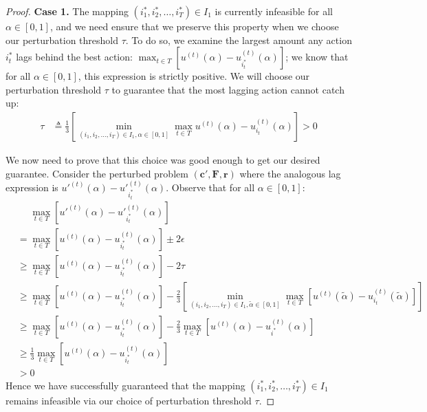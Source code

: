 \documentclass{article}
\newcommand{\CostVector}{\bm{c}}
\newcommand{\ForecastTensor}{\bm{F}}
\newcommand{\RewardVector}{\bm{r}}
\newcommand{\TransferCoefficient}{\alpha}
\newcommand{\actionmapping}{(i_1, i_2, \ldots, i_T)}
\newcommand{\optactionmapping}{(i^*_1, i^*_2, \ldots, i^*_T)}
\begin{document}
\begin{proof}
  \textbf{Case 1.} The mapping $\optactionmapping \in I_1$ is currently infeasible for all $\TransferCoefficient \in [0, 1]$, and we need ensure that we preserve this property when we choose our perturbation threshold $\tau$. To do so, we examine the largest amount any action $i^*_t$ lags behind the best action: $\max_{t \in T} \left[ u^{(t)}(\TransferCoefficient) - u^{(t)}_{i^*_t}(\TransferCoefficient) \right]$; we know that for all $\TransferCoefficient \in [0, 1]$, this expression is strictly positive. We will choose our perturbation threshold $\tau$ to guarantee that the most lagging action cannot catch up:
  \begin{align*}
    \tau &\triangleq \frac13 \left[ \min_{\actionmapping \in I_1, \TransferCoefficient \in [0, 1]} \max_{t \in T} u^{(t)}(\TransferCoefficient) - u^{(t)}_{i_t}(\TransferCoefficient) \right] > 0
  \end{align*}
  
  We now need to prove that this choice was good enough to get our desired guarantee. Consider the perturbed problem $(\CostVector', \ForecastTensor, \RewardVector)$ where the analogous lag expression is $u'^{(t)}(\TransferCoefficient) - u'^{(t)}_{i^*_t}(\TransferCoefficient)$. Observe that for all $\TransferCoefficient \in [0, 1]$:
  \begin{align*}
    &\phantom{=} \max_{t \in T} \left[ u'^{(t)}(\TransferCoefficient) - u'^{(t)}_{i^*_t}(\TransferCoefficient) \right] \\
    &= \max_{t \in T} \left[ u^{(t)}(\TransferCoefficient) - u^{(t)}_{i^*_t}(\TransferCoefficient) \right] \pm 2 \epsilon \\
    &\ge \max_{t \in T} \left[ u^{(t)}(\TransferCoefficient) - u^{(t)}_{i^*_t}(\TransferCoefficient) \right] - 2 \tau \\
    &\ge \max_{t \in T} \left[ u^{(t)}(\TransferCoefficient) - u^{(t)}_{i^*_t}(\TransferCoefficient) \right]
         - \frac23 \left[ \min_{\actionmapping \in I_1, \tilde{\TransferCoefficient} \in [0, 1]}
                          \max_{t \in T} \left[ u^{(t)}(\tilde{\TransferCoefficient}) - u^{(t)}_{i_t}(\tilde{\TransferCoefficient}) \right] \right] \\
    &\ge \max_{t \in T} \left[ u^{(t)}(\TransferCoefficient) - u^{(t)}_{i^*_t}(\TransferCoefficient) \right] - \frac23 \max_{t \in T} \left[ u^{(t)}(\TransferCoefficient) - u^{(t)}_{i^*}(\TransferCoefficient) \right] \\
    &\ge \frac13 \max_{t \in T} \left[ u^{(t)}(\TransferCoefficient) - u^{(t)}_{i^*_t}(\TransferCoefficient) \right] \\
    &> 0
  \end{align*}
  Hence we have successfully guaranteed that the mapping $\optactionmapping \in I_1$ remains infeasible via our choice of perturbation threshold $\tau$.
  

\end{proof}
\end{document}
